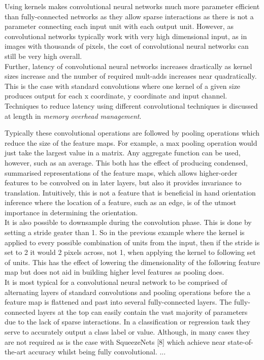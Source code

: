 \documentclass{article}
\begin{document}
Using kernels makes convolutional neural networks much more parameter efficient than fully-connected networks as they allow sparse interactions as there is not a parameter connecting each input unit with each output unit. However, as convolutional networks typically work with very high dimensional input, as in images with thousands of pixels, the cost of convolutional neural networks can still be very high overall. \\

Further, latency of convolutional neural networks increases drastically as kernel sizes increase and the number of required mult-adds increases near quadratically. This is the case with standard convolutions where one kernel of a given size produces output for each x coordinate, y coordinate and input channel. Techniques to reduce latency using different convolutional techniques is discussed at length in \emph{memory overhead management}.

Typically these convolutional operations are followed by pooling operations which reduce the size of the feature maps. For example, a max pooling operation would just take the largest value in a matrix. Any aggregate function can be used, however, such as an average. This both has the effect of producing condensed, summarised representations of the feature maps, which allows higher-order features to be convolved on in later layers, but also it provides invariance to translation. Intuitively, this is not a feature that is beneficial in hand orientation inference where the location of a feature, such as an edge, is of the utmost importance in determining the orientation. \\

It is also possible to downsample during the convolution phase. This is done by setting a stride geater than 1. So in the previous example where the kernel is applied to every possible combination of units from the input, then if the stride is set to 2 it would 2 pixels across, not 1, when applying the kernel to following set of units. This has the effect of lowering the dimensionality of the following feature map but does not aid in building higher level features as pooling does.\\

It is most typical for a convolutional neural network to be comprised of alternating layers of standard convolutions and pooling operations before the a feature map is flattened and past into several fully-connected layers. The fully-connected layers at the top can easily contain the vast majority of parameters due to the lack of sparse interactions. In a classification or regression task they serve to accurately output a class label or value. Although, in many cases they are not required as is the case with SqueezeNets [8] which achieve near state-of-the-art accuracy whilst being fully convolutional. ... \\
\end{document}
